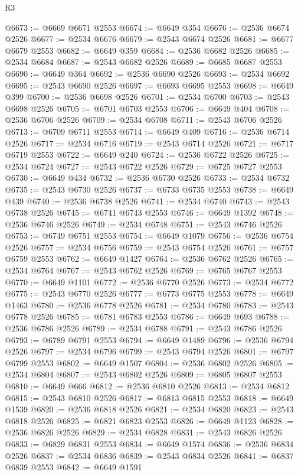 \begin{lexlean}{R3}
\begin{coremodule}
@6673 := @6669 @6671 @2553
@6674 := @6649 @354
@6676 := @2536 @6674 @2526
@6677 := @2534 @6676
@6679 := @2543 @6674 @2526
@6681 := @6677 @6679 @2553
@6682 := @6649 @359
@6684 := @2536 @6682 @2526
@6685 := @2534 @6684
@6687 := @2543 @6682 @2526
@6689 := @6685 @6687 @2553
@6690 := @6649 @364
@6692 := @2536 @6690 @2526
@6693 := @2534 @6692
@6695 := @2543 @6690 @2526
@6697 := @6693 @6695 @2553
@6698 := @6649 @399
@6700 := @2536 @6698 @2526
@6701 := @2534 @6700
@6703 := @2543 @6698 @2526
@6705 := @6701 @6703 @2553
@6706 := @6649 @404
@6708 := @2536 @6706 @2526
@6709 := @2534 @6708
@6711 := @2543 @6706 @2526
@6713 := @6709 @6711 @2553
@6714 := @6649 @409
@6716 := @2536 @6714 @2526
@6717 := @2534 @6716
@6719 := @2543 @6714 @2526
@6721 := @6717 @6719 @2553
@6722 := @6649 @240
@6724 := @2536 @6722 @2526
@6725 := @2534 @6724
@6727 := @2543 @6722 @2526
@6729 := @6725 @6727 @2553
@6730 := @6649 @434
@6732 := @2536 @6730 @2526
@6733 := @2534 @6732
@6735 := @2543 @6730 @2526
@6737 := @6733 @6735 @2553
@6738 := @6649 @439
@6740 := @2536 @6738 @2526
@6741 := @2534 @6740
@6743 := @2543 @6738 @2526
@6745 := @6741 @6743 @2553
@6746 := @6649 @1392
@6748 := @2536 @6746 @2526
@6749 := @2534 @6748
@6751 := @2543 @6746 @2526
@6753 := @6749 @6751 @2553
@6754 := @6649 @1079
@6756 := @2536 @6754 @2526
@6757 := @2534 @6756
@6759 := @2543 @6754 @2526
@6761 := @6757 @6759 @2553
@6762 := @6649 @1427
@6764 := @2536 @6762 @2526
@6765 := @2534 @6764
@6767 := @2543 @6762 @2526
@6769 := @6765 @6767 @2553
@6770 := @6649 @1101
@6772 := @2536 @6770 @2526
@6773 := @2534 @6772
@6775 := @2543 @6770 @2526
@6777 := @6773 @6775 @2553
@6778 := @6649 @1463
@6780 := @2536 @6778 @2526
@6781 := @2534 @6780
@6783 := @2543 @6778 @2526
@6785 := @6781 @6783 @2553
@6786 := @6649 @693
@6788 := @2536 @6786 @2526
@6789 := @2534 @6788
@6791 := @2543 @6786 @2526
@6793 := @6789 @6791 @2553
@6794 := @6649 @1489
@6796 := @2536 @6794 @2526
@6797 := @2534 @6796
@6799 := @2543 @6794 @2526
@6801 := @6797 @6799 @2553
@6802 := @6649 @1507
@6804 := @2536 @6802 @2526
@6805 := @2534 @6804
@6807 := @2543 @6802 @2526
@6809 := @6805 @6807 @2553
@6810 := @6649 @666
@6812 := @2536 @6810 @2526
@6813 := @2534 @6812
@6815 := @2543 @6810 @2526
@6817 := @6813 @6815 @2553
@6818 := @6649 @1539
@6820 := @2536 @6818 @2526
@6821 := @2534 @6820
@6823 := @2543 @6818 @2526
@6825 := @6821 @6823 @2553
@6826 := @6649 @1123
@6828 := @2536 @6826 @2526
@6829 := @2534 @6828
@6831 := @2543 @6826 @2526
@6833 := @6829 @6831 @2553
@6834 := @6649 @1574
@6836 := @2536 @6834 @2526
@6837 := @2534 @6836
@6839 := @2543 @6834 @2526
@6841 := @6837 @6839 @2553
@6842 := @6649 @1591

\end{coremodule}
\end{lexlean}
